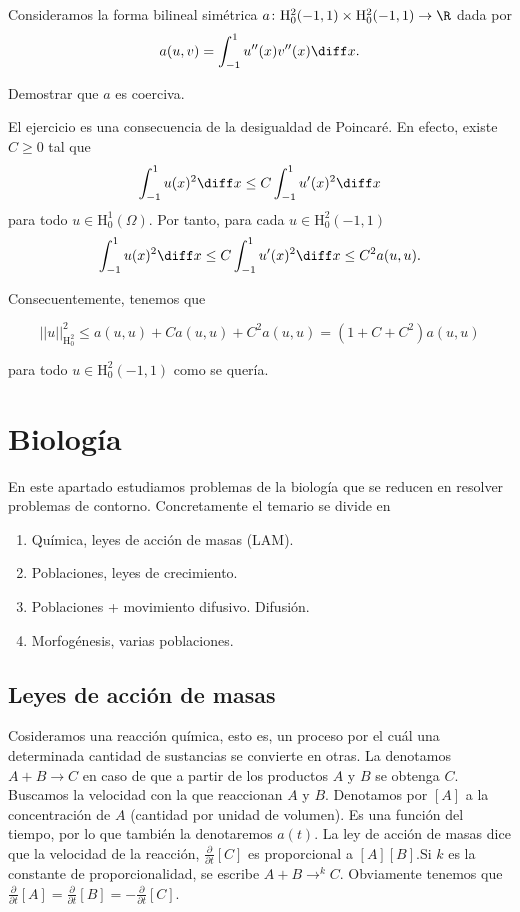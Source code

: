 \documentclass{article}
\begin{document}
\begin{ex}
  Consideramos la forma bilineal simétrica
  $a \colon \mathrm{H}_0^2(-1,1) \times \mathrm{H}_0^2(-1,1) \to \R$ dada por
  \[ a(u,v) = \int_{-1}^{1} u''(x) v''(x) \diff x. \]

  Demostrar que $a$ es coerciva.

  El ejercicio es una consecuencia de la desigualdad de Poincaré. En efecto, existe $C \ge 0$ tal
  que
  \[ \int_{-1}^1 u(x)^2 \diff x \le C \int_{-1}^1 u'(x)^2 \diff x\] para todo
  $u \in \mathrm{H}_0^1(\Omega)$.  Por tanto, para cada $u \in \mathrm{H}_0^2(-1,1)$
  \[ \int_{-1}^1 u(x)^2 \diff x \le C \int_{-1}^1 u'(x)^2 \diff x \le C^2 a(u,u).\]

  Consecuentemente, tenemos que

  \[ ||u||_{\mathrm{H}^2_0}^2 \le a(u,u) + C a(u,u) + C^2 a(u,u) = (1+C+C^2) a(u,u) \]

  para todo $u \in \mathrm{H}_0^2(-1,1)$ como se quería.
\end{ex}


\newpage

\section{Biología}

En este apartado estudiamos problemas de la biología que se reducen en resolver problemas de contorno. Concretamente el temario se divide en

\begin{enumerate}
\item Química, leyes de acción de masas (LAM).
\item Poblaciones, leyes de crecimiento.
\item Poblaciones + movimiento difusivo. Difusión.
\item Morfogénesis, varias poblaciones.
\end{enumerate}

\subsection{Leyes de acción de masas}

Cosideramos una reacción química, esto es, un proceso por el cuál una determinada cantidad de
sustancias se convierte en otras. La denotamos $A+B \rightarrow C$ en caso de que a partir de los
productos $A$ y $B$ se obtenga $C$. Buscamos la velocidad con la que reaccionan $A$ y $B$. Denotamos
por $\left[ A \right]$ a la concentración de $A$ (cantidad por unidad de volumen). Es una función
del tiempo, por lo que también la denotaremos $a(t)$. La ley de acción de masas dice que la
velocidad de la reacción, $\frac{\partial}{\partial t}\left[ C \right]$ es proporcional a
$\left[ A \right]\left[ B \right]$.Si $k$ es la constante de proporcionalidad, se escribe
$A+B \rightarrow^k C$. Obviamente tenemos que
$\frac{\partial}{\partial t}[A] = \frac{\partial}{\partial t}[B] = - \frac{\partial}{\partial
  t}[C]$.
\end{document}
